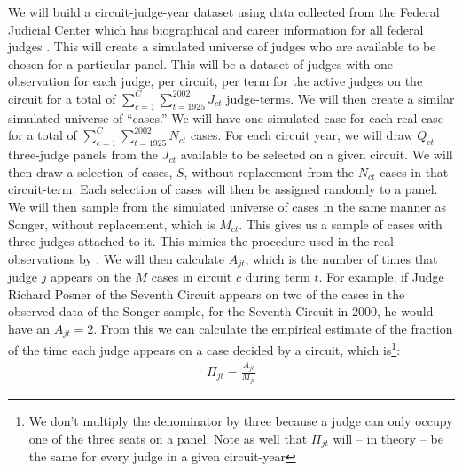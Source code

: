 \documentclass[12pt]{article}
\begin{document}
We will build a circuit-judge-year dataset using data collected from the Federal Judicial Center which has biographical and career information for all federal judges \citep{FJC}.  This will create a simulated universe of judges who are available to be chosen for a particular panel.  This will be a dataset of judges  with one observation for each judge, per circuit, per term for the active judges on the circuit for a total of $\sum_{c=1}^{C}\sum_{t=1925}^{2002}J_{ct}$ judge-terms.  We will then create a similar simulated universe of ``cases.''  We will have one simulated case for each real case for a total of $\sum_{c=1}^{C}\sum_{t=1925}^{2002}N_{ct}$ cases.  For each circuit year, we will draw $Q_{ct}$ three-judge panels from the $J_{ct}$ available to be selected on a given circuit.  We will then draw a selection of cases, $S$, without replacement from the $N_{ct}$ cases in that circuit-term.  Each selection of cases will then be assigned randomly to a panel.  We will then sample from the simulated universe of cases in the same manner as Songer, without replacement, which is $M_{ct}$.  This gives us a sample of cases with three judges attached to it.  This mimics the procedure used in the real observations by \citet{Songer2007}.  We will then calculate $A_{jt}$, which is the number of times that judge $j$ appears on the $M$ cases in circuit $c$ during term $t$.  For example, if Judge Richard Posner of the Seventh Circuit appears on two of the cases in the observed data of the Songer sample, for the Seventh Circuit in 2000, he would have an $A_{jt}=2$.  From this we can calculate the empirical estimate of the fraction of the time each judge appears on a case decided by a circuit, which is\footnote{We don't multiply the denominator by three because a judge can only occupy one of the three seats on a panel. Note as well that $\Pi_{jt}$ will -- in theory -- be the same for every judge in a given circuit-year}:
\begin{align}\label{eq-probs}
\Pi_{jt}=\frac{A_{jt}}{M_{jt}}
\end{align}
\end{document}
